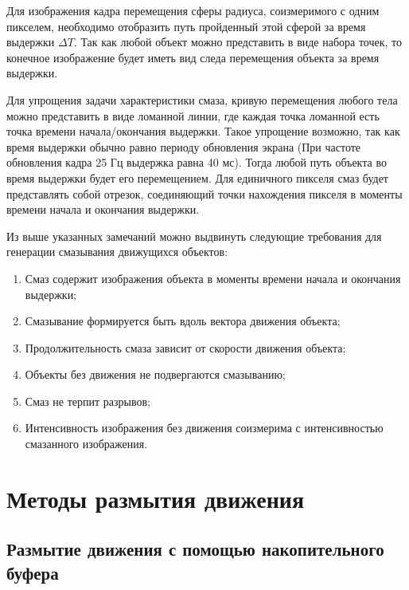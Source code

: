Для изображения кадра перемещения сферы радиуса, соизмеримого с одним пикселем, необходимо отобразить путь пройденный этой сферой за время выдержки $\Delta T$. Так как любой объект можно представить в виде набора точек, то конечное изображение будет иметь вид следа перемещения объекта за время выдержки.
\par
Для упрощения задачи характеристики смаза, кривую перемещения любого тела можно представить в виде ломанной линии, где каждая точка ломанной есть точка времени начала/окончания выдержки. Такое упрощение возможно, так как время выдержки обычно равно периоду обновления экрана (При частоте обновления кадра 25 Гц выдержка равна 40 мс). Тогда любой путь объекта во время выдержки будет его перемещением. Для единичного пикселя смаз будет представлять собой отрезок, соединяющий точки нахождения пикселя в моменты времени начала и окончания выдержки.      
\par
Из выше указанных замечаний можно выдвинуть следующие требования для генерации смазывания движущихся объектов:
\begin{enumerate}
    \item Смаз содержит изображения объекта в моменты времени начала и окончания выдержки;
    \item Смазывание формируется быть вдоль вектора движения объекта;
    \item Продолжительность смаза зависит от скорости движения объекта;
    \item Объекты без движения не подвергаются смазыванию;
    \item Смаз не терпит разрывов;
    \item Интенсивность изображения без движения соизмерима с интенсивностью смазанного изображения.
\end{enumerate}

\section{Методы размытия движения}

\subsection{Размытие движения с помощью накопительного буфера}

